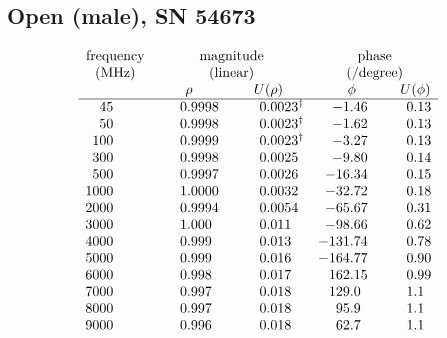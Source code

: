 \documentclass[11pt,a4paper]{article}
\begin{document}
\subsection{Open (male), SN 54673}

 \begin{center} %
 
 \begin{singlespace}
 
 	\small	%
 
  	\setlength{\extrarowheight}{3pt}
  
	\[
  		\begin{array}{SSSSS}
    		\multicolumn{1}{c}{ \text{frequency} } & 
    		\multicolumn{2}{c}{ \text{magnitude} } &
    		\multicolumn{2}{c}{ \text{phase} } 
    		\\
    		\multicolumn{1}{c}{ \si{(MHz)} } &  
    		\multicolumn{2}{c}{ (\text{linear}) } &
    		\multicolumn{2}{c}{ \text{(/degree)} }  
    		\\
     		& {\rho} & {U(\rho)} & {\phi} & {U(\phi)} 
     		\\ \hline %

		45 &   0.9998 &   0.0023$^\dagger$ &    -1.46 &     0.13     \\
		50 &   0.9998 &   0.0023$^\dagger$ &    -1.62 &     0.13     \\
		100 &   0.9999 &   0.0023$^\dagger$ &    -3.27 &     0.13    \\
		300 &   0.9998 &   0.0025 &    -9.80 &     0.14    \\
		500 &   0.9997 &   0.0026 &   -16.34 &     0.15    \\
		1000 &   1.0000 &   0.0032 &   -32.72 &     0.18   \\
		2000 &   0.9994 &   0.0054 &   -65.67 &     0.31  \\
		3000 &    1.000 &    0.011 &   -98.66 &     0.62   \\
		4000 &    0.999 &    0.013 &  -131.74 &     0.78   \\
		5000 &    0.999 &    0.016 &  -164.77 &     0.90   \\
		6000 &    0.998 &    0.017 &  +162.15 &     0.99   \\
		7000 &    0.997 &    0.018 &   +129.0 &      1.1   \\
		8000 &    0.997 &    0.018 &    +95.9 &      1.1   \\
		9000 &    0.996 &    0.018 &    +62.7 &      1.1  \\
		

\end{array}\]
\end{singlespace}
\end{center}
\end{document}
